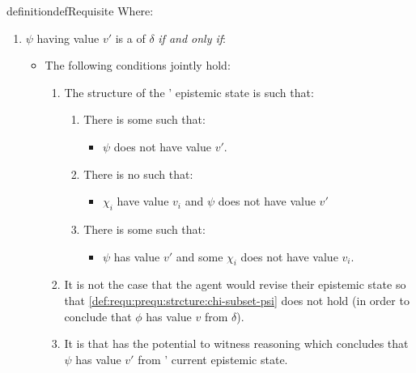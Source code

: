 \begin{note}
\begin{restatable}[A \requ{0}]{definition}{defRequisite}
    Where:
    \begin{enumerate}[label=\named{P\(\Re\)}, ref=\named{P\(\Re\)}]
    \item
      \label{def:requ:prequ}
      \(\psi\) having value \(v'\) is a \emph{\prequ{}} of \(\delta\) \emph{if and only if}:
      \begin{itemize}
      \item
        The following conditions jointly hold:
        \begin{enumerate}[label=\arabic*., ref=\named{P\(\Re\):\arabic*}]
        \item
          \label{def:requ:prequ:strcture}
          The structure of the \vAgent{}' epistemic state is such that:
          \begin{enumerate}[label=\alph*., ref=\named{P\(\Re\):1\alph*}]
          \item
            \label{def:requ:prequ:strcture:psi-not-v}
            There is some \epVW{} such that:
            \begin{itemize}
            \item
              \(\psi\) does not have value \(v'\).
            \end{itemize}
          \item
            \label{def:requ:prequ:strcture:chi-subset-psi}
            There is no \epVW{} such that:
            \begin{itemize}
            \item
              \(\chi_{i}\) have value \(v_{i}\) and \(\psi\) does not have value \(v'\)
            \end{itemize}
          \item
            \label{def:requ:prequ:strcture:chi-propersubset-psi}
            There is some \epVW{} such that:
            \begin{itemize}
            \item
              \(\psi\) has value \(v'\) and some \(\chi_{i}\) does not have value \(v_{i}\).
            \end{itemize}
          \end{enumerate}
        \item
          \label{def:requ:prequ:no-revision}
          It is not the case that the agent would revise their epistemic state so that \ref{def:requ:prequ:strcture:chi-subset-psi} does not hold (in order to conclude that \(\phi\) has value \(v\) from \(\delta\)).
        \item
          \label{def:requ:prequ:possible-reason}
          It is \epVAd{} that \vAgent{} has the potential to witness reasoning which concludes that \(\psi\) has value \(v'\) from \vAgent{}' current epistemic state.
        \end{enumerate}
      \end{itemize}
    \end{enumerate}


\end{restatable}
\end{note}

